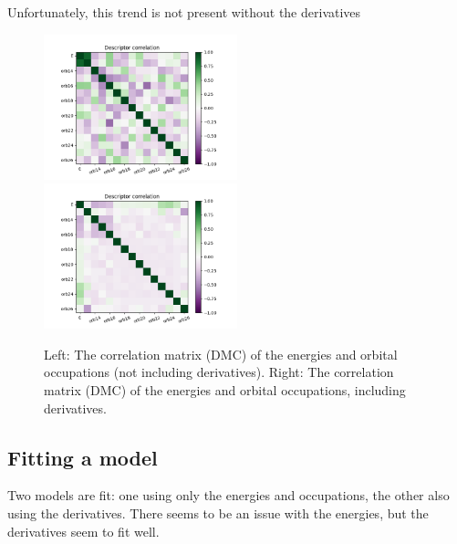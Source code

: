 Unfortunately, this trend is not present without the derivatives
\begin{figure}[h!]
\includegraphics[width=0.5\textwidth]{images/vmc_lowen_corrmat.png}
\includegraphics[width=0.5\textwidth]{images/dmc_allderivs_lowen_corrmat.png}
\label{fig:descriptors_corrmat}
\caption{
Left: The correlation matrix (DMC) of the energies and orbital occupations (not including derivatives). 
Right: The correlation matrix (DMC) of the energies and orbital occupations, including derivatives.}
\end{figure}

\subsection{Fitting a model}

Two models are fit: one using only the energies and occupations, the other also using the derivatives.
There seems to be an issue with the energies, but the derivatives seem to fit well.

